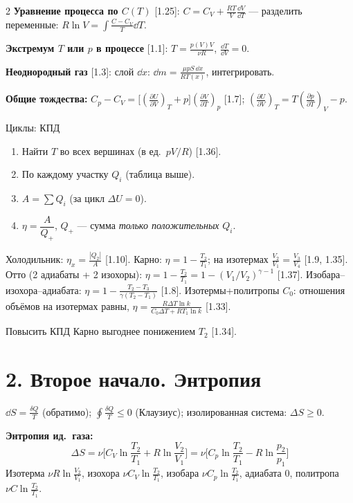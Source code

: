 \documentclass[10pt]{article}
\newcommand{\see}[1]{\textcolor{excol}{[#1]}}
\begin{document}
\begin{multicols}{2}
\textbf{Уравнение процесса по $C(T)$} \see{1.25}: $C=C_V+\frac{RT}{V}\frac{\dd V}{\dd T}$ — разделить переменные:
$R\ln V=\int\frac{C-C_V}{T}\dd T$.

\textbf{Экстремум $T$ или $p$ в процессе} \see{1.1}: $T=\frac{p(V)V}{\nu R}$, $\frac{\dd T}{\dd V}=0$.

\textbf{Неоднородный газ} \see{1.3}: слой $\dd x$: $\dd m=\frac{\mu pS\,\dd x}{RT(x)}$, интегрировать.

\textbf{Общие тождества:}
$C_p-C_V=\big[(\frac{\partial U}{\partial V})_T+p\big](\frac{\partial V}{\partial T})_p$ \see{1.7};
$(\frac{\partial U}{\partial V})_T=T(\frac{\partial p}{\partial T})_V-p$.

\begin{method}{Циклы: КПД}
\begin{enumerate}
\item Найти $T$ во всех вершинах (в ед.\ $pV/R$) \see{1.36}.
\item По каждому участку $Q_i$ (таблица выше).
\item $A=\sum Q_i$ (за цикл $\Delta U=0$).
\item $\eta=\dfrac{A}{Q_+}$, $Q_+$ — сумма \emph{только положительных} $Q_i$.
\end{enumerate}
Холодильник: $\eta_x=\frac{|Q_2|}{A}$ \see{1.10}.
Карно: $\eta=1-\frac{T_2}{T_1}$; на изотермах $\frac{V_2}{V_1}=\frac{V_3}{V_4}$ \see{1.9, 1.35}.
Отто (2 адиабаты + 2 изохоры): $\eta=1-\frac{T_2}{T_1}=1-(V_1/V_2)^{\gamma-1}$ \see{1.37}.
Изобара–изохора–адиабата: $\eta=1-\frac{T_2-T_3}{\gamma(T_2-T_1)}$ \see{1.8}.
Изотермы+политропы $C_0$: отношения объёмов на изотермах равны, $\eta=\frac{R\Delta T\ln k}{C_0\Delta T+RT_1\ln k}$ \see{1.33}.
\end{method}

Повысить КПД Карно выгоднее понижением $T_2$ \see{1.34}.

\section*{2. Второе начало. Энтропия}

$\dd S=\frac{\delta Q}{T}$ (обратимо);\; $\oint\frac{\delta Q}{T}\le0$ (Клаузиус);
изолированная система: $\Delta S\ge0$.

\textbf{Энтропия ид.\ газа:}
\[\Delta S=\nu\Big[C_V\ln\frac{T_2}{T_1}+R\ln\frac{V_2}{V_1}\Big]
=\nu\Big[C_p\ln\frac{T_2}{T_1}-R\ln\frac{p_2}{p_1}\Big]\]
Изотерма $\nu R\ln\frac{V_2}{V_1}$, изохора $\nu C_V\ln\frac{T_2}{T_1}$, изобара $\nu C_p\ln\frac{T_2}{T_1}$, адиабата $0$,
политропа $\nu C\ln\frac{T_2}{T_1}$.


\end{multicols}
\end{document}
